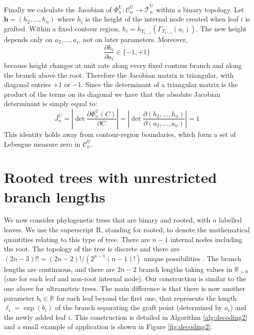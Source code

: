 \documentclass{article}
\begin{document}
Finally we calculate the Jacobian of
$\Phi_n^\mathrm{U}:\mathcal{C}_n^\mathrm{U}\rightarrow
\overline{\mathcal{T}}_n^\mathrm{U}$ within a binary topology.
Let $\boldsymbol{h}=(h_2,...,h_n)$ where $h_i$ is the height of the internal node
created when leaf $i$ is grafted. Within a fixed contour region, $h_i=h_{T_{i-1}}(\Gamma_{T_{i-1}}(a_i))$.
The new height depends only on $a_2,...,a_i$, not on later parameters. Moreover,
\[
\frac{\partial h_i}{\partial a_i}\in \{-1,+1\}
\]
because height changes at unit rate along every fixed contour branch and along the branch
above the root. Therefore the Jacobian matrix is triangular, with diagonal entries $+1$ or $-1$. Since the determinant of a triangular matrix is the product of the terms on its diagonal we have that the absolute Jacobian determinant is simply equal to:
\begin{equation}
\label{eq:jacobian1}
J_n^\mathrm{U}=\left|\det\frac{\partial\Phi_n^\mathrm{U}(C)}{\partial C}\right|
=\left|
\det\frac{\partial(h_2,...,h_n)}
{\partial(a_2,...,a_n)}
\right|=1
\end{equation}
This identity holds away from contour-region boundaries, which form a set
of Lebesgue measure zero in $\mathcal{C}_n^\mathrm{U}$.

\section{Rooted trees with unrestricted branch lengths}

We now consider phylogenetic trees that are binary and rooted, with $n$ labelled leaves. 
We use the superscript R, standing for rooted, 
to denote the mathematical quantities relating to this
type of tree.
There are $n-1$ internal nodes including the root.
The topology of the tree is 
discrete and there are 
$(2n-3)!!=(2n-2)!/(2^{n-1}(n-1)!)$ unique possibilities \citep{Felsenstein1978b}. 
The branch lengths are continuous, and there are $2n-2$ branch lengths
taking values in $\mathbb{R}_{>0}$ (one for each leaf and non-root internal node). 
Our construction is similar to the one above for ultrametric trees. 
The main difference is that there is now another parameter $b_i \in \mathbb{R}$
for each leaf beyond the first one, that represents the length 
$\ell_i=\exp(b_i)$ of the branch
separating the graft point (determined by $a_i$) and the newly added leaf $i$. This construction is detailed in Algorithm \ref{alg:decoding2}
and a small example of application is shown in Figure \ref{fig:decoding2}.
\end{document}
